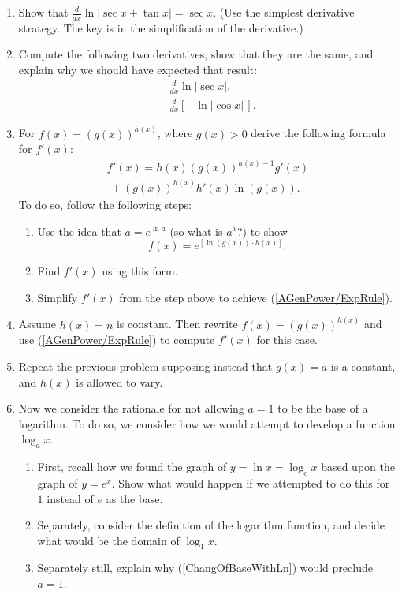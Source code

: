 \begin{multicols}{2}
\begin{enumerate}
\begin{enumerate}
    \end{enumerate} 
\item Show that $\frac{d}{dx}\ln|\sec x+\tan x|=\sec x$.
        (Use the simplest derivative strategy.  The key
         is in the simplification of the derivative.)
\item Compute the following two derivatives, show that
        they are the same, and 
        explain why we should have expected that result:
        \begin{align*}
        &\frac{d}{dx}\ln|\sec x|,\\
        &\frac{d}{dx}[-\ln|\cos x|\,].\end{align*} 
\item For $f(x)=(g(x))^{h(x)}$, where $g(x)>0$ derive the
       following formula for $f'(x)$:
       \begin{multline}
          f'(x)=h(x)(g(x))^{h(x)-1}g'(x)\\
           \ +(g(x))^{h(x)}h'(x)\ln(g(x)).\label{AGenPower/ExpRule}
       \end{multline}
       To do so, follow the following steps:
      \begin{enumerate}
      \item Use the idea that  $a=e^{\ln a}$ (so what is $a^x$?)
            to show  $$f(x)=e^{[\ln(g(x))\cdot h(x)]}.$$
      \item Find $f'(x)$ using this form.
      \item Simplify $f'(x)$ from the step above to achieve 
              (\ref{AGenPower/ExpRule}).
      \end{enumerate}
\item Assume $h(x)=n$ is constant.  Then rewrite $f(x)=(g(x))^{h(x)}$
     and use (\ref{AGenPower/ExpRule})
     to compute $f'(x)$  for this case.
\item Repeat the previous problem supposing
       instead that $g(x)=a$ is a constant, and $h(x)$ is
     allowed to vary.
\item Now we consider the rationale for not allowing $a=1$ to
       be the base of a logarithm.  To do so, we consider
       how we would attempt to develop a function $\log_ax$.
    \begin{enumerate}
    \item First, recall how we found the graph of $y=\ln x=\log_ex$
          based upon the graph of $y=e^x$.  Show what would
          happen if we attempted to do this for $1$ instead of $e$
          as the base.
    \item Separately, consider the definition of the logarithm
          function, and decide what would be the domain of $\log_1x$.
    \item Separately still, explain why (\ref{ChangOfBaseWithLn})
          would preclude $a=1$.

    \end{enumerate}

\end{enumerate}
\end{multicols}
\newpage
